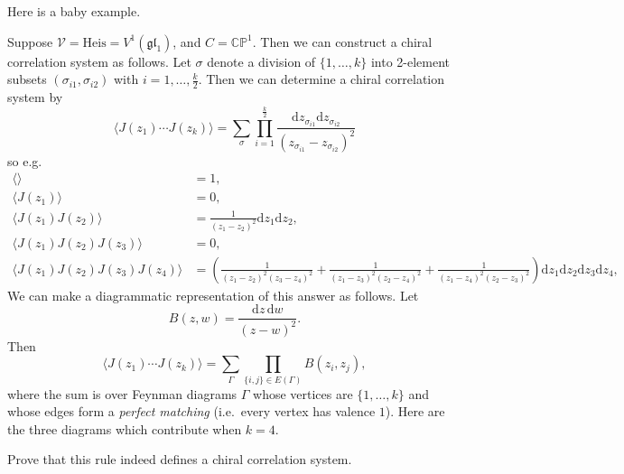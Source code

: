\documentclass[12pt,letterpaper,reqno]{amsart}
\numberwithin{equation}{section}
\newcommand{\fgl}{{\mathfrak {gl}}}
\newcommand{\Heis}{{\mathrm{Heis}}}
\newcommand{\bbC}{\ensuremath{\mathbb C}}
\newcommand{\bbP}{\ensuremath{\mathbb P}}
\newcommand{\de}{\mathrm{d}}
\newcommand{\vertex}{\mathcal{V}}
\newcommand{\IP}[1]{\langle#1\rangle}
\begin{document}

\begin{example}

Here is a baby example.

Suppose $\vertex = \Heis = V^1(\fgl_1)$, and $C = \bbC \bbP^1$. 
Then we can construct a chiral correlation system as follows.
Let $\sigma$ denote a division of $\{1, \dots, k\}$ into 
2-element subsets $(\sigma_{i1}, \sigma_{i2})$ with $i = 1, \dots, \frac{k}{2}$. Then we can determine a chiral correlation system by
\begin{equation}
  \IP{J(z_1) \cdots J(z_k)} = \sum_\sigma \prod_{i=1}^{\frac{k}{2}} \frac{\de z_{\sigma_{i1}} \de z_{\sigma_{i2}}}{(z_{\sigma_{i1}} - z_{\sigma_{i2}})^2}
\end{equation}
so e.g.
\begin{align}
 \IP{} &= 1, \\
 \IP{J(z_1)} &= 0, \\
 \IP{J(z_1) J(z_2)} &= \frac{1}{(z_1 - z_2)^2} \de z_1 \de z_2, \\
 \IP{J(z_1) J(z_2) J(z_3)} &= 0, \\
 \IP{J(z_1) J(z_2) J(z_3) J(z_4)} &= \left( \frac{1}{(z_1 - z_2)^2 (z_3 - z_4)^2} + \frac{1}{(z_1 - z_3)^2 (z_2 - z_4)^2} + \frac{1}{(z_1 - z_4)^2 (z_2 - z_3)^2}  \right)  \de z_1 \de z_2 \de z_3 \de z_4, 
\end{align}
We can make a diagrammatic representation of this answer as follows.
Let
\[
B(z,w) = \frac{\de z\,\de w}{(z-w)^2}.
\]
Then
\[
\langle J(z_1)\cdots J(z_k)\rangle
=
\sum_{\Gamma} \prod_{\{i,j\}\in E(\Gamma)} B(z_i,z_j),
\]
where the sum is over Feynman diagrams 
$\Gamma$ whose vertices are $\{1,\dots,k\}$ and whose edges form a
\emph{perfect matching} (i.e.\ every vertex has valence $1$).
Here are the three diagrams which contribute when $k=4$.



\end{example}

\begin{exercise} Prove that this rule indeed defines
a chiral correlation system.
\end{exercise}
\end{document}
